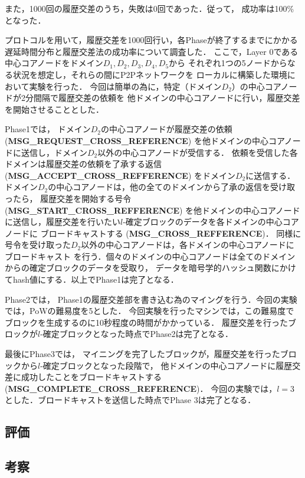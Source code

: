 \documentclass[a4paper,12pt]{jsarticle}
\begin{document}
また，1000回の履歴交差のうち，失敗は0回であった．従って，
成功率は100\%となった．

プロトコルを用いて，履歴交差を1000回行い，各Phaseが終了するまでにかかる
遅延時間分布と履歴交差法の成功率について調査した．
ここで，Layer 0である中心コアノードをドメイン$D_1, D_2, D_3, D_4, D_5$から
それぞれ1つの5ノードからなる状況を想定し，それらの間にP2Pネットワークを
ローカルに構築した環境において実験を行った．
今回は簡単の為に，特定（ドメイン$D_2$）の中心コアノードが2分間隔で履歴交差の依頼を
他ドメインの中心コアノードに行い，履歴交差を開始させることとした．

Phase1では，
ドメイン$D_2$の中心コアノードが履歴交差の依頼 (\textbf{MSG\_REQUEST\_CROSS\_REFERENCE})
を他ドメインの中心コアノードに送信し，ドメイン$D_2$以外の中心コアノードが受信する．
依頼を受信した各ドメインは履歴交差の依頼を了承する返信 (\textbf{MSG\_ACCEPT\_CROSS\_REFFERENCE})
をドメイン$D_2$に送信する．
ドメイン$D_2$の中心コアノードは，他の全てのドメインから了承の返信を受け取ったら，
履歴交差を開始する号令 (\textbf{MSG\_START\_CROSS\_REFFERENCE}) を他ドメインの中心コアノード
に送信し，履歴交差を行いたい$l$-確定ブロックのデータを各ドメインの中心コアノードに
ブロードキャストする (\textbf{MSG\_CROSS\_REFFERENCE})．
同様に号令を受け取った$D_2$以外の中心コアノードは，各ドメインの中心コアノードにブロードキャスト
を行う．個々のドメインの中心コアノードは全てのドメインからの確定ブロックのデータを受取り，
データを暗号学的ハッシュ関数にかけてhash値にする．以上でPhase1は完了となる．

Phase2では，
Phase1の履歴交差部を書き込む為のマイングを行う．今回の実験では，PoWの難易度を5とした．
今回実験を行ったマシンでは，この難易度でブロックを生成するのに10秒程度の時間がかかっている．
履歴交差を行ったブロックが$l$-確定ブロックとなった時点でPhase2は完了となる．

最後にPhase3では，
マイニングを完了したブロックが，履歴交差を行ったブロックから$l$-確定ブロックとなった段階で，
他ドメインの中心コアノードに履歴交差に成功したことをブロードキャストする
 (\textbf{MSG\_COMPLETE\_CROSS\_REFERENCE})．
今回の実験では，$l=3$とした．ブロードキャストを送信した時点でPhase 3は完了となる．






\subsection{評価}
\subsection{考察}
\newpage
\end{document}
